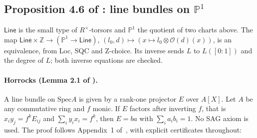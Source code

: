 \documentclass[11pt]{article}
\newcommand{\PP}{\mathbb{P}^1}
\newcommand{\Spec}{\mathrm{Spec}}
\theoremstyle{remark}
\begin{document}
\subsection*{Proposition 4.6 of \cite{Proj}: line bundles on $\PP$}

$\mathsf{Line}$ is the small type of $R^\times$-torsors and $\PP$ the
quotient of two charts above. The map
$\mathsf{Line}\times\mathbb Z\to(\PP\to\mathsf{Line})$,
$(l_0,d)\mapsto(x\mapsto l_0\otimes\mathcal O(d)(x))$, is an equivalence,
from Loc, SQC and Z-choice. Its inverse sends $L$ to $L([0:1])$ and the
degree of $L$; both inverse equations are checked.

\paragraph{Horrocks (Lemma 2.1 of \cite{Proj}).} A line bundle on
$\Spec A$ is given by a rank-one projector $E$ over $A[X]$. Let $A$ be
any commutative ring and $f$ monic. If $E$ factors after inverting $f$,
that is $x_iy_j=f^kE_{ij}$ and $\sum_iy_ix_i=f^k$, then $E=ba$ with
$\sum_ia_ib_i=1$. No SAG axiom is used. The proof follows Appendix~1
of~\cite{Proj}, with explicit certificates throughout:
\end{document}
